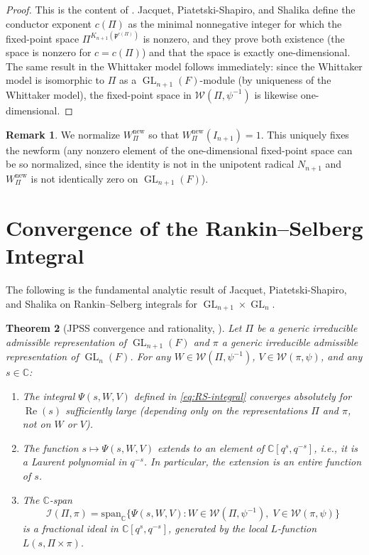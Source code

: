 \documentclass[12pt]{article}
\newtheorem{theorem}{Theorem}
\theoremstyle{definition}
\newtheorem{remark}[theorem]{Remark}
\DeclareMathOperator{\GL}{GL}
\DeclareMathOperator{\Re}{Re}
\begin{document}
\begin{proof}
This is the content of \cite[Theorems~(1) and~(2)]{JPSS81}.  Jacquet,
Piatetski-Shapiro, and Shalika define the conductor exponent $c(\Pi)$ as
the minimal nonneg\-ative integer for which the fixed-point space
$\Pi^{K_{n+1}(\mathfrak{p}^{c(\Pi)})}$ is nonzero, and they prove both existence
(the space is nonzero for $c = c(\Pi)$) and that the space is exactly
one-dimensional.  The same result in the Whittaker model follows immediately:
since the Whittaker model is isomorphic to $\Pi$ as a $\GL_{n+1}(F)$-module
(by uniqueness of the Whittaker model), the fixed-point space in
$\mathcal{W}(\Pi,\psi^{-1})$ is likewise one-dimensional.
\end{proof}

\begin{remark}
We normalize $W_\Pi^{\mathrm{new}}$ so that $W_\Pi^{\mathrm{new}}(I_{n+1}) = 1$.
This uniquely fixes the newform (any nonzero element of the one-dimensional
fixed-point space can be so normalized, since the identity is not in the
unipotent radical $N_{n+1}$ and $W_\Pi^{\mathrm{new}}$ is not identically zero
on $\GL_{n+1}(F)$).
\end{remark}

\section{Convergence of the Rankin--Selberg Integral}
\label{sec:convergence}

The following is the fundamental analytic result of Jacquet, Piatetski-Shapiro,
and Shalika on Rankin--Selberg integrals for $\GL_{n+1} \times \GL_n$.

\begin{theorem}[JPSS convergence and rationality, \cite{JPSS83}]
\label{thm:JPSS-convergence}
Let $\Pi$ be a generic irreducible admissible representation of $\GL_{n+1}(F)$
and $\pi$ a generic irreducible admissible representation of $\GL_n(F)$.
For any $W \in \mathcal{W}(\Pi,\psi^{-1})$, $V \in \mathcal{W}(\pi,\psi)$, and
any $s \in \mathbb{C}$:
\begin{enumerate}
\item[(a)] The integral $\Psi(s,W,V)$ defined in \eqref{eq:RS-integral} converges
  absolutely for $\Re(s)$ sufficiently large (depending only on the representations
  $\Pi$ and $\pi$, not on $W$ or $V$).
\item[(b)] The function $s \mapsto \Psi(s,W,V)$ extends to an element of
  $\mathbb{C}[q^s, q^{-s}]$, i.e., it is a Laurent polynomial in $q^{-s}$.
  In particular, the extension is an entire function of $s$.
\item[(c)] The $\mathbb{C}$-span
  \[
    \mathcal{I}(\Pi,\pi)
    = \mathrm{span}_{\mathbb{C}}\bigl\{ \Psi(s,W,V) :
      W \in \mathcal{W}(\Pi,\psi^{-1}),\; V \in \mathcal{W}(\pi,\psi) \bigr\}
  \]
  is a fractional ideal in $\mathbb{C}[q^s,q^{-s}]$, generated by the local
  $L$-function $L(s,\Pi\times\pi)$.
\end{enumerate}
\end{theorem}
\end{document}
